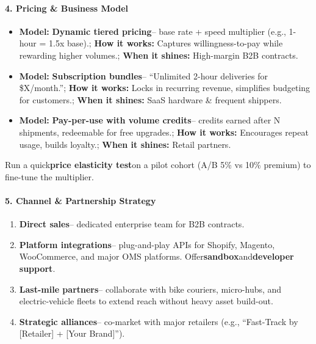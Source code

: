 \begin{persistbenchsample}[title={GPT-OSS-120B -- Cos Similarity Partitioned -> Partitioned -- Sample 3 (+3 Improvement)}]
\paragraph{4. Pricing \& Business Model}
\begin{itemize}
  \item \textbf{Model:} \textbf{Dynamic tiered pricing}-- base rate + speed multiplier (e.g., 1-hour = 1.5x base).; \textbf{How it works:} Captures willingness-to-pay while rewarding higher volumes.; \textbf{When it shines:} High-margin B2B contracts.
  \item \textbf{Model:} \textbf{Subscription bundles}-- ``Unlimited 2-hour deliveries for \$X/month.''; \textbf{How it works:} Locks in recurring revenue, simplifies budgeting for customers.; \textbf{When it shines:} SaaS hardware \& frequent shippers.
  \item \textbf{Model:} \textbf{Pay-per-use with volume credits}-- credits earned after N shipments, redeemable for free upgrades.; \textbf{How it works:} Encourages repeat usage, builds loyalty.; \textbf{When it shines:} Retail partners.
\end{itemize}

Run a quick\textbf{price elasticity test}on a pilot cohort (A/B 5\% vs 10\% premium) to fine-tune the multiplier.

\paragraph{5. Channel \& Partnership Strategy}
\begin{enumerate}
  \item \textbf{Direct sales}-- dedicated enterprise team for B2B contracts.
  \item \textbf{Platform integrations}-- plug-and-play APIs for Shopify, Magento, WooCommerce, and major OMS platforms. Offer\textbf{sandbox}and\textbf{developer support}.
  \item \textbf{Last-mile partners}-- collaborate with bike couriers, micro-hubs, and electric-vehicle fleets to extend reach without heavy asset build-out.
  \item \textbf{Strategic alliances}-- co-market with major retailers (e.g., ``Fast-Track by [Retailer] + [Your Brand]'').
\end{enumerate}


\end{persistbenchsample}
